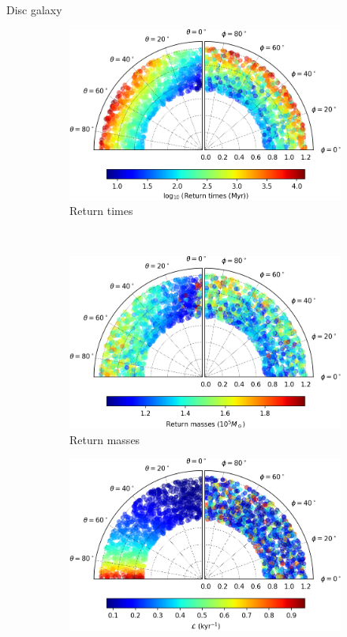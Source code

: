 \documentclass{beamer}
\begin{document}
\begin{frame}{Disc galaxy}
	\begin{figure}[h]
		\centering
		\begin{subfigure}[t]{0.35\textwidth}
			\includegraphics[width = \textwidth]{"../Files/Week 13/images/3_time"}
			\caption{Return times}
		\end{subfigure}
		~ 
		\begin{subfigure}[t]{0.35\textwidth}
			\includegraphics[width=\textwidth]{"../Files/Week 13/images/3_mass"}
			\caption{Return masses}
		\end{subfigure}
		\begin{subfigure}[t]{0.35\textwidth}
			\includegraphics[width=\textwidth]{"../Files/Week 13/images/3_lyapunov"}

\end{subfigure}
\end{figure}
\end{frame}
\end{document}
